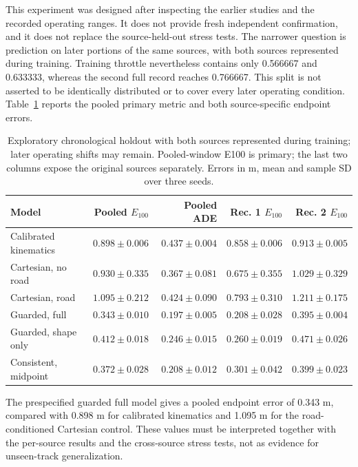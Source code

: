 \documentclass[preprint,12pt]{elsarticle}
\begin{document}
This experiment was designed after inspecting the earlier studies and the
recorded operating ranges. It does not provide fresh independent confirmation,
and it does not replace the source-held-out stress tests. The narrower question
is prediction on later portions of the same sources, with both sources represented
during training. Training throttle nevertheless contains only 0.566667 and
0.633333, whereas the second full record reaches 0.766667. This split is not
asserted to be identically distributed or to cover every later operating condition. Table~\ref{tab:temporal} reports the pooled primary
metric and both source-specific endpoint errors.
\begin{table}[t]
\centering
\caption{Exploratory chronological holdout with both sources represented during training; later operating shifts may remain. Pooled-window E100 is primary; the last two columns expose the original sources separately. Errors in m, mean and sample SD over three seeds.}
\label{tab:temporal}
\footnotesize
\setlength{\tabcolsep}{3pt}
\begin{tabular}{lrrrr}
\toprule
Model & Pooled $E_{100}$ & Pooled ADE & Rec. 1 $E_{100}$ & Rec. 2 $E_{100}$ \\
\midrule
Calibrated kinematics & $0.898 \pm 0.006$ & $0.437 \pm 0.004$ & $0.858 \pm 0.006$ & $0.913 \pm 0.005$ \\
Cartesian, no road & $0.930 \pm 0.335$ & $0.367 \pm 0.081$ & $0.675 \pm 0.355$ & $1.029 \pm 0.329$ \\
Cartesian, road & $1.095 \pm 0.212$ & $0.424 \pm 0.090$ & $0.793 \pm 0.310$ & $1.211 \pm 0.175$ \\
Guarded, full & $0.343 \pm 0.010$ & $0.197 \pm 0.005$ & $0.208 \pm 0.028$ & $0.395 \pm 0.004$ \\
Guarded, shape only & $0.412 \pm 0.018$ & $0.246 \pm 0.015$ & $0.260 \pm 0.019$ & $0.471 \pm 0.026$ \\
Consistent, midpoint & $0.372 \pm 0.028$ & $0.208 \pm 0.012$ & $0.301 \pm 0.042$ & $0.399 \pm 0.023$ \\
\bottomrule
\end{tabular}
\end{table}
The prespecified guarded full model gives a pooled endpoint error of 0.343 m, compared with 0.898 m for calibrated kinematics and 1.095 m for the road-conditioned Cartesian control. These values must be interpreted together with the per-source results and the cross-source stress tests, not as evidence for unseen-track generalization.
\end{document}

